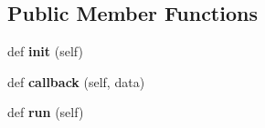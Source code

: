 \subsection*{Public Member Functions}
\begin{DoxyCompactItemize}
\item 
def {\bfseries init} (self)\hypertarget{classRecorder__PC_1_1RecorderPC_ae8cf41196e47b914112bfd1419d0e7db}{}\label{classRecorder__PC_1_1RecorderPC_ae8cf41196e47b914112bfd1419d0e7db}

\item 
def {\bfseries callback} (self, data)\hypertarget{classRecorder__PC_1_1RecorderPC_a387074d112fd0542749467be5a091ba5}{}\label{classRecorder__PC_1_1RecorderPC_a387074d112fd0542749467be5a091ba5}

\item 
def {\bfseries run} (self)\hypertarget{classRecorder__PC_1_1RecorderPC_af5dcab9276871eb387d633181ec416aa}{}\label{classRecorder__PC_1_1RecorderPC_af5dcab9276871eb387d633181ec416aa}

\end{DoxyCompactItemize}
